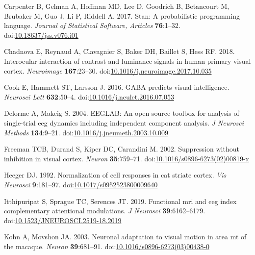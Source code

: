 \documentclass[]{article}
\begin{document}
\leavevmode\hypertarget{ref-Carpenter2017}{}%
Carpenter B, Gelman A, Hoffman MD, Lee D, Goodrich B, Betancourt M, Brubaker M, Guo J, Li P, Riddell A. 2017. Stan: A probabilistic programming language. \emph{Journal of Statistical Software, Articles} \textbf{76}:1--32. doi:\href{https://doi.org/10.18637/jss.v076.i01}{10.18637/jss.v076.i01}

\leavevmode\hypertarget{ref-Chadnova2018}{}%
Chadnova E, Reynaud A, Clavagnier S, Baker DH, Baillet S, Hess RF. 2018. Interocular interaction of contrast and luminance signals in human primary visual cortex. \emph{Neuroimage} \textbf{167}:23--30. doi:\href{https://doi.org/10.1016/j.neuroimage.2017.10.035}{10.1016/j.neuroimage.2017.10.035}

\leavevmode\hypertarget{ref-Cook2016}{}%
Cook E, Hammett ST, Larsson J. 2016. GABA predicts visual intelligence. \emph{Neurosci Lett} \textbf{632}:50--4. doi:\href{https://doi.org/10.1016/j.neulet.2016.07.053}{10.1016/j.neulet.2016.07.053}

\leavevmode\hypertarget{ref-Delorme2004}{}%
Delorme A, Makeig S. 2004. EEGLAB: An open source toolbox for analysis of single-trial eeg dynamics including independent component analysis. \emph{J Neurosci Methods} \textbf{134}:9--21. doi:\href{https://doi.org/10.1016/j.jneumeth.2003.10.009}{10.1016/j.jneumeth.2003.10.009}

\leavevmode\hypertarget{ref-Freeman2002}{}%
Freeman TCB, Durand S, Kiper DC, Carandini M. 2002. Suppression without inhibition in visual cortex. \emph{Neuron} \textbf{35}:759--71. doi:\href{https://doi.org/10.1016/s0896-6273(02)00819-x}{10.1016/s0896-6273(02)00819-x}

\leavevmode\hypertarget{ref-Heeger1992}{}%
Heeger DJ. 1992. Normalization of cell responses in cat striate cortex. \emph{Vis Neurosci} \textbf{9}:181--97. doi:\href{https://doi.org/10.1017/s0952523800009640}{10.1017/s0952523800009640}

\leavevmode\hypertarget{ref-Itthipuripat2019}{}%
Itthipuripat S, Sprague TC, Serences JT. 2019. Functional mri and eeg index complementary attentional modulations. \emph{J Neurosci} \textbf{39}:6162--6179. doi:\href{https://doi.org/10.1523/JNEUROSCI.2519-18.2019}{10.1523/JNEUROSCI.2519-18.2019}

\leavevmode\hypertarget{ref-Kohn2003}{}%
Kohn A, Movshon JA. 2003. Neuronal adaptation to visual motion in area mt of the macaque. \emph{Neuron} \textbf{39}:681--91. doi:\href{https://doi.org/10.1016/s0896-6273(03)00438-0}{10.1016/s0896-6273(03)00438-0}
\end{document}
